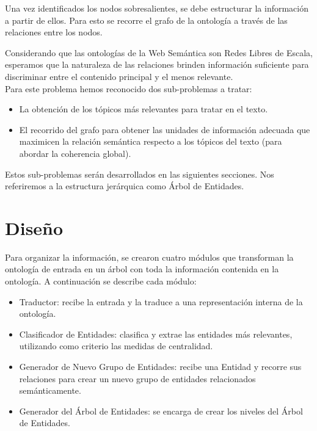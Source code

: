 Una vez identificados los nodos sobresalientes, se debe estructurar la información a partir de ellos. Para esto se recorre el grafo de la ontología a través de las relaciones entre los nodos.

Considerando que las ontologías de la Web Semántica son Redes Libres de Escala, esperamos que la naturaleza de las relaciones brinden información suficiente para discriminar entre el contenido principal y el menos relevante.
\\

Para este problema hemos reconocido dos sub-problemas a tratar:

\begin{itemize}
    \item La obtención de los tópicos más relevantes para tratar en el texto.%
    \item El recorrido del grafo para obtener las unidades de información adecuada que maximicen la relación semántica respecto a los tópicos del texto (para abordar la coherencia global).%
\end{itemize}

Estos sub-problemas serán desarrollados en las siguientes secciones.  Nos referiremos a la estructura jerárquica como Árbol de Entidades.


\section{Diseño}
Para organizar la información, se crearon cuatro módulos que transforman la ontología de entrada en un árbol con toda la información contenida en la ontología. A continuación se describe cada módulo:
\begin{itemize}
    \item Traductor: recibe la entrada y la traduce a una representación interna de la ontología.
    \item Clasificador de Entidades: clasifica y extrae las entidades más relevantes, utilizando como criterio las medidas de centralidad.
    \item Generador de Nuevo Grupo de Entidades: recibe una Entidad y recorre sus relaciones para crear un nuevo grupo de entidades relacionados semánticamente.
    \item Generador del Árbol de Entidades: se encarga de crear los niveles del Árbol de Entidades. 
\end{itemize}

